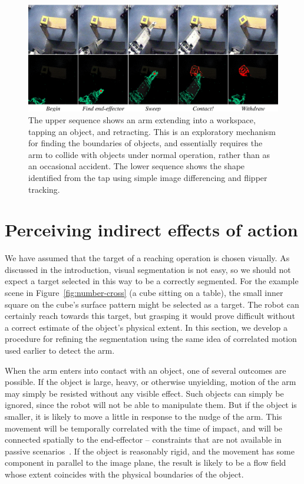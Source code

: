 
\begin{figure}[tbh]
\begin{center}
\includegraphics[width=\textwidth]{poking-sequence.eps}
\caption{ 
\label{fig:poking-sequence}
%
  The upper sequence shows an arm extending into a workspace, tapping
  an object, and retracting.  This is an exploratory mechanism for
  finding the boundaries of objects, and essentially requires the arm
  to collide with objects under normal operation, rather than as an
  occasional accident.  The lower sequence shows the shape
  identified from the tap using simple image differencing and flipper
  tracking.
%
}
\end{center}
\end{figure}


\section{Perceiving indirect effects of action}

We have assumed that the target of a reaching operation is chosen
visually.  As discussed in the introduction, visual
segmentation is not easy, so we should not expect a target selected in
this way to be a correctly segmented.  For the example scene in
Figure~\ref{fig:number-cross} 
(a cube sitting on a table), the small
inner square on the cube's surface pattern might be selected as a
target.  The robot can certainly reach towards this target, but
grasping it would prove difficult without a correct estimate of the
object's physical extent.  In this section, we develop a procedure
for refining the segmentation using the same idea of correlated
motion used earlier to detect the arm.

When the arm enters into contact with an object, one of several
outcomes are possible.  If the object is large, heavy, or otherwise
unyielding, motion of the arm may simply be resisted without any
visible effect.  Such objects can simply be ignored, since the robot
will not be able to manipulate them.  But if the object is smaller, it
is likely to move a little in response to the nudge of the arm.  This
movement will be temporally correlated with the time of impact, and
will be connected spatially to the end-effector -- constraints that
are not available in passive scenarios~\cite{birchfield99depth}.  If
the object is reasonably rigid, and the movement has some component in
parallel to the image plane, the result is likely to be a flow field
whose extent coincides with the physical boundaries of the object.

